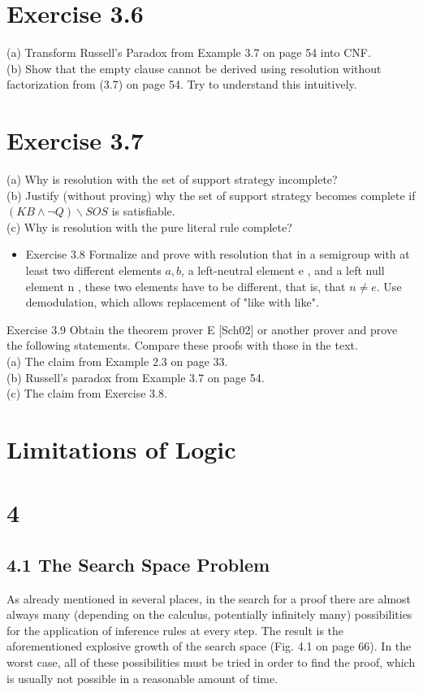 \documentclass[10pt]{book}
\begin{document}
\section*{Exercise 3.6}
(a) Transform Russell's Paradox from Example 3.7 on page 54 into CNF.\\
(b) Show that the empty clause cannot be derived using resolution without factorization from (3.7) on page 54. Try to understand this intuitively.

\section*{Exercise 3.7}
(a) Why is resolution with the set of support strategy incomplete?\\
(b) Justify (without proving) why the set of support strategy becomes complete if $(K B \wedge \neg Q) \backslash S O S$ is satisfiable.\\
(c) Why is resolution with the pure literal rule complete?

\begin{itemize}
  \item Exercise 3.8 Formalize and prove with resolution that in a semigroup with at least two different elements $a, b$, a left-neutral element e , and a left null element n , these two elements have to be different, that is, that $n \neq e$. Use demodulation, which allows replacement of "like with like".
\end{itemize}

Exercise 3.9 Obtain the theorem prover E [Sch02] or another prover and prove the following statements. Compare these proofs with those in the text.\\
(a) The claim from Example 2.3 on page 33.\\
(b) Russell's paradox from Example 3.7 on page 54.\\
(c) The claim from Exercise 3.8.

\section*{Limitations of Logic}
\section*{4}
\subsection*{4.1 The Search Space Problem}
As already mentioned in several places, in the search for a proof there are almost always many (depending on the calculus, potentially infinitely many) possibilities for the application of inference rules at every step. The result is the aforementioned explosive growth of the search space (Fig. 4.1 on page 66). In the worst case, all of these possibilities must be tried in order to find the proof, which is usually not possible in a reasonable amount of time.
\end{document}
